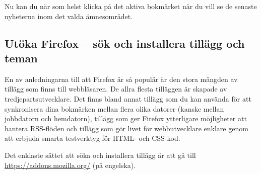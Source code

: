 \documentclass[a4paper,final]{memoir} %
\begin{document}
Nu kan du när som helst klicka på det aktiva bokmärket när du vill se de senaste nyheterna inom det valda ämnesområdet.







\subsection{Utöka Firefox -- sök och installera tillägg och teman}\label{sec:tillagg}


En av anledningarna till att Firefox är så populär är den stora mängden av tillägg som finns till webbläsaren. De allra flesta tilläggen är skapade av tredjepartsutvecklare. Det finns bland annat tillägg som du kan använda för att synkronisera dina bokmärken mellan flera olika datorer (kanske mellan jobbdatorn och hemdatorn), tillägg som ger Firefox ytterligare möjligheter att hantera RSS-flöden och tillägg som gör livet för webbutvecklare enklare genom att erbjuda smarta testverktyg för HTML- och CSS-kod.

Det enklaste sättet att söka och installera tillägg är att gå till \url{https://addons.mozilla.org/} (på engelska). %
\end{document}
